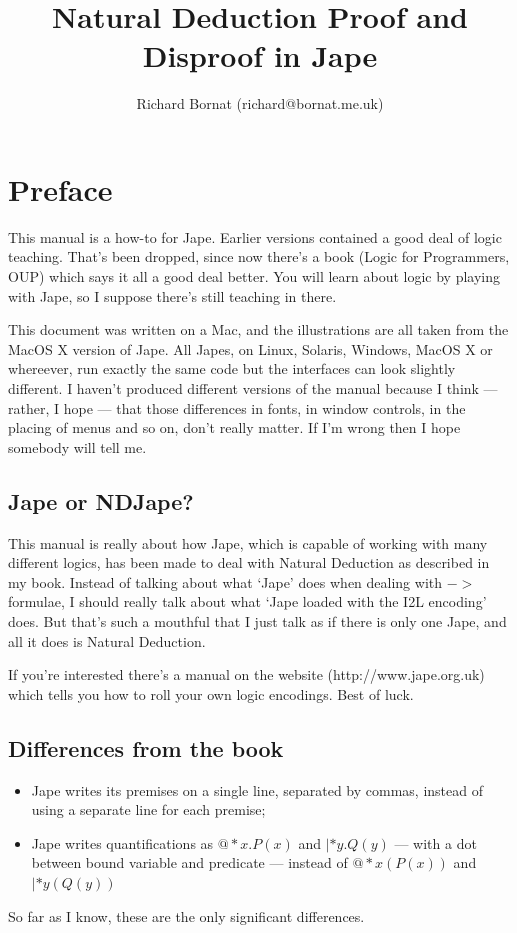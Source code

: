 \documentclass[11pt]{book}
\title{\huge Natural Deduction Proof and Disproof in Jape}
\author{Richard Bornat (richard@bornat.me.uk)}
\begin{document}
\maketitle


\chapter*{Preface}

This manual is a how-to for Jape. Earlier versions contained a good deal of logic teaching. That's been dropped, since now there's a book (Logic for Programmers, OUP) which says it all a good deal better. You will learn about logic by playing with Jape, so I suppose there's still teaching in there.

This document was written on a Mac, and the illustrations are all taken from the MacOS X version of Jape. All Japes, on Linux, Solaris, Windows, MacOS X or whereever, run exactly the same code but the interfaces can look slightly different. I haven't produced different versions of the manual because I think --- rather, I hope --- that those differences in fonts, in window controls, in the placing of menus and so on, don't really matter. If I'm wrong then I hope somebody will tell me.

\section*{Jape or NDJape?}

This manual is really about how Jape, which is capable of working with many different logics, has been made to deal with Natural Deduction as described in my book. Instead of talking about what `Jape' does when dealing with $->$ formulae, I should really talk about what `Jape loaded with the I2L encoding' does. But that's such a mouthful that I just talk as if there is only one Jape, and all it does is Natural Deduction.

If you're interested there's a manual on the website (http://www.jape.org.uk) which tells you how to roll your own logic encodings. Best of luck.

\section{Differences from the book}
\begin{itemize}
\item Jape writes its premises on a single line, separated by commas, instead of using a separate line for each premise;
\item Jape writes quantifications as $@*x.P(x)$ and $|*y.Q(y)$ --- with a dot between bound variable and predicate --- instead of $@*x(P(x))$ and $|*y(Q(y))$
\end{itemize}
So far as I know, these are the only significant differences.
\end{document}
